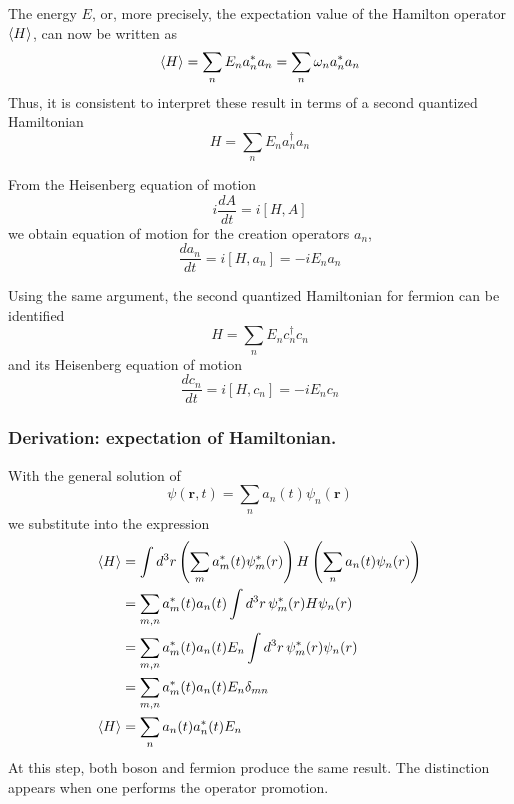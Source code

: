 \documentclass[../../../main.tex]{subfiles}
\begin{document}
The energy $E$, or, more precisely, the expectation value of the Hamilton operator $\braket{H }$, can now be written as
\begin{equation*}
  \braket{H }
  = \sum_{n} E_{n} a_{n}^{*} a_{n} = \sum_{n} \omega_{n} a_{n}^{*} a_{n}
\end{equation*}
Thus, it is consistent to interpret these result in terms of a second quantized Hamiltonian
\begin{equation*}
  H = \sum_{n} E_{n} a_{n}^{\dagger} a_{n}
\end{equation*}

From the Heisenberg equation of motion
\begin{equation*}
  i \frac{dA}{dt  } = i [H,A]
\end{equation*}
we obtain equation of motion for the creation operators \(a_{n}\),
\begin{equation*}
  \frac{da_{n}}{dt} = i [H, a_{n}] = -i E_{n} a_{n}
\end{equation*}

Using the same argument, the second quantized Hamiltonian for fermion can be identified
\begin{equation*}
  H = \sum_{n} E_{n} c_{n}^{\dagger} c_{n}
\end{equation*}
and its Heisenberg equation of motion
\begin{equation*}
  \frac{dc_{n}}{dt} = i [H, c_{n}] = -i E_{n} c_{n}
\end{equation*}

\subsubsection{Derivation: expectation of Hamiltonian.}
With the general solution of
\begin{equation*}
  \psi(\mathbf{r}, t) = \sum_n a_n(t) \psi_n(\mathbf{r})
\end{equation*}
we substitute into the expression
\begin{align*}
  \braket{H }
   & =  \int d^3 r \left( \sum_{m} a_m^*(t) \psi_m^*(r) \right) H \left( \sum_{n} a_n(t) \psi_n(r) \right) \\
   & =  \sum_{m,n} a_m^*(t) a_n(t) \int d^3 r \, \psi_m^*(r) H \psi_n(r)                                   \\
   & = \sum_{m,n} a^*_m(t) a_n(t) E_n \int d^3 r \, \psi^*_m(r) \psi_n(r)                                  \\
   & = \sum_{m,n} a^*_m(t) a_n(t) E_n \delta_{mn}                                                          \\
  \braket{H }
   & = \sum_{n}  a_n(t) a^*_n(t) E_n
\end{align*}
At this step, both boson and fermion produce the same result.
The distinction appears when one performs the operator promotion.
\end{document}
